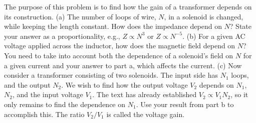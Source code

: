         The purpose of this problem is to find how the gain of a transformer
        depends on its construction.\hwendpart
        (a) The number of loops of wire, $N$, in a solenoid is changed, 
        while keeping the length constant. How does the impedance
        depend on $N$? State your answer as a proportionality,
        e.g., $Z\propto N^3$ or $Z\propto N^{-5}$.\hwendpart
        (b) For a given AC voltage applied across the inductor, how does the
        magnetic field depend on $N$?
        You need to take into account both the dependence of a solenoid's field on $N$ for a
        given current and your answer to part a, which affects the current.\hwendpart
        (c) Now consider a transformer consisting of two solenoids. The input
        side has $N_1$ loops, and the output $N_2$. We wish to find how the
        output voltage $V_2$ depends on $N_1$, $N_2$, and the input voltage
        $V_1$. The text has already established $V_2\propto V_1N_2$, so it only
        remains to find the dependence on $N_1$. Use your result from part b
        to accomplish this. The ratio $V_2/V_1$ is called the voltage gain.
